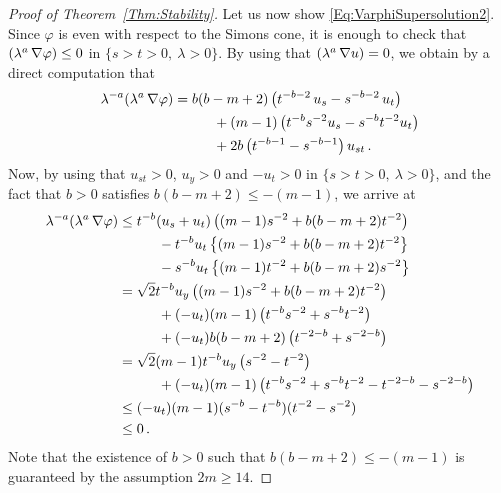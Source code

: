 \documentclass[twoside,leqno,symbols-for-thanks, draft]{rmi}
\numberwithin{equation}{section}
\theoremstyle{definition}
\let\div\relax
\DeclareMathOperator{\div}{div}
\begin{document}
\begin{proof}[Proof of Theorem~\ref{Thm:Stability}]
	Let us now show \eqref{Eq:VarphiSupersolution2}. Since $\varphi$ is even with respect to the Simons cone, it is enough to check that $\div{(\lambda^a\,\nabla\varphi)}\leq 0$ in $\{s>t>0, \ \lambda >0\}$. By using that $\div(\lambda^a\,\nabla u) = 0$, we obtain by a direct computation that 
	\begin{align*}
	\lambda^{-a} \div(\lambda^a\,\nabla \varphi) &= b(b-m+2) \left( t^{-b-2}\,u_s - s^{-b-2}\,u_t \right) \\
	& \hspace{10mm} + (m-1) \left( t^{-b} s^{-2} u_s - s^{-b} t^{-2} u_t \right) \\
	& \hspace{10mm} + 2b \left( t^{-b-1} - s^{-b-1} \right) u_{st}\,.
	\end{align*}
	Now, by using that $u_{st}>0$, $u_y>0$ and $-u_t>0$ in $\{s>t>0, \ \lambda >0\}$, and the fact that $b>0$ satisfies $b(b-m+2)\leq -(m-1) $, we arrive at
	\begin{align*}
	\lambda^{-a} \div(\lambda^a\,\nabla \varphi) &\leq t^{-b} (u_s+u_t) \left( (m-1) s^{-2} + b(b-m+2) t^{-2}\right) \\
	& \hspace{10mm} - t^{-b} u_t \left\{ (m-1) s^{-2} + b(b-m+2) t^{-2} \right\} \\
	& \hspace{10mm} - s^{-b} u_t \left\{ (m-1) t^{-2} + b(b-m+2) s^{-2} \right\} \\
	&= \sqrt{2} t^{-b} u_y \left( (m-1) s^{-2} + b(b-m+2) t^{-2}\right) \\
	& \hspace{10mm} + (-u_t) (m-1) \left( t^{-b} s^{-2} + s^{-b} t^{-2} \right) \\
	& \hspace{10mm} + (-u_t) b (b-m+2) \left( t^{-2-b} + s^{-2-b} \right) \\
	&= \sqrt{2} (m-1) t^{-b} u_y \left( s^{-2} - t^{-2}\right) \\
	& \hspace{10mm} + (-u_t) (m-1) \left( t^{-b} s^{-2} + s^{-b} t^{-2} - t^{-2-b} - s^{-2-b} \right) \\
	& \leq (-u_t) (m-1) (s^{-b}-t^{-b}) (t^{-2}-s^{-2}) \\
	& \leq 0\,.
	\end{align*}
	Note that the existence of $b>0$ such that $b(b-m+2)\leq -(m-1)$ is guaranteed by the assumption $2m\geq 14$.
	
	
	

\end{proof}
\end{document}
